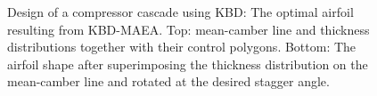 \begin{figure}[h!]
\begin{minipage}[b]{1\linewidth}
 \centering
\end{minipage}
\caption{Design of a compressor cascade using KBD: The optimal airfoil resulting from KBD-MAEA. Top: mean-camber line and thickness distributions together with their control polygons. Bottom: The airfoil shape after superimposing the thickness distribution on the mean-camber line and rotated at the desired stagger angle.} 
\label{CBRDrelaRes}
\end{figure}



%
